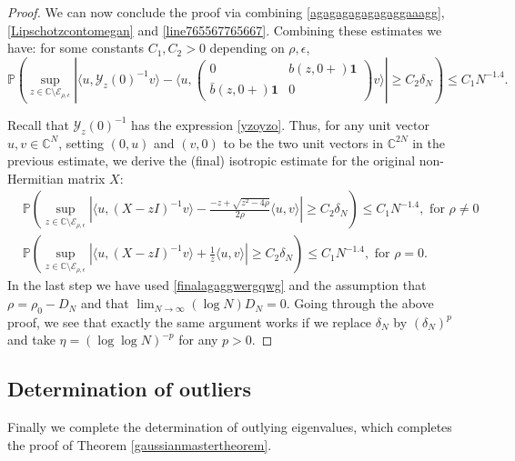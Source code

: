 \documentclass[11pt,reqno]{amsart}
\theoremstyle{plain}
\theoremstyle{remark}
\numberwithin{equation}{section}
\begin{document}
\begin{proof}
We can now conclude the proof via combining \eqref{agagagagagagaggaaagg}, \eqref{Lipschotzcontomegan} and \eqref{line765567765667}. Combining these estimates we have: for some constants $C_1,C_2>0$ depending on $\rho,\epsilon$,
\begin{equation}\label{finalfinalfinalsss}
\mathbb{P}\left( \sup_{z\in\mathbb{C}\setminus\mathcal{E}_{\rho,\epsilon
}}\left| \langle u,
\mathcal{Y}_z(0)^{-1}v\rangle -\langle u,\begin{pmatrix}
    0&b(z,0+)\mathbf{1}\\\bar{b}(z,0+)\mathbf{1}&0
\end{pmatrix}
v\rangle
\right|\geq C_2\delta_N\right)\leq C_1N^{-1.4}.
\end{equation}

Recall that $\mathcal{Y}_z(0)^{-1}$ has the expression \eqref{yzoyzo}. Thus, for any unit vector $u,v\in\mathbb{C}^N$, setting $(0,u)$ and $(v,0)$ to be the two unit vectors in $\mathbb{C}^{2N}$ in the previous estimate, we derive the (final) isotropic estimate for the original non-Hermitian matrix $X$: 
\begin{equation}\begin{aligned}&
\mathbb{P}\left( \sup_{z\in\mathbb{C}\setminus\mathcal{E}_{\rho,\epsilon
}}\left| \langle u,
(X-zI)^{-1}v\rangle -\frac{-z+\sqrt{z^2-4\rho}}{2\rho}\langle u,
v\rangle
\right|\geq C_2\delta_N\right)\leq C_1 N^{-1.4},\text{ for } \rho\neq 0
\\&
\mathbb{P}\left( \sup_{z\in\mathbb{C}\setminus\mathcal{E}_{\rho,\epsilon
}}\left| \langle u,
(X-zI)^{-1}v\rangle +\frac{1}{z}\langle u,
v\rangle
\right|\geq C_2\delta_N\right) \leq C_1 N^{-1.4},\text{ for } \rho= 0.\end{aligned}
\end{equation}
In the last step we have used  \eqref{finalagaggwergqwg} and the assumption that $\rho=\rho_0-D_N$ and that  $\lim_{N\to\infty}(\log N)D_N=0.$
Going through the above proof, we see that exactly the same argument works if we replace $\delta_N$ by $(\delta_N)^p$ and take $\eta=(\log\log N)^{-p}$ for any $p>0$.
\end{proof}


\subsection{Determination of outliers}
Finally we complete the determination of outlying eigenvalues, which completes the proof of Theorem \ref{gaussianmastertheorem}. 
\end{document}
